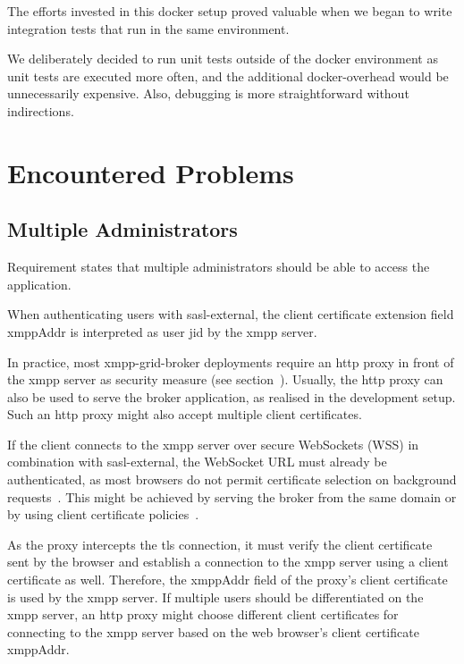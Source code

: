 The efforts invested in this docker setup proved valuable when we began to write integration tests that run in the same environment.

We deliberately decided to run unit tests outside of the docker environment as unit tests are executed more often, and the additional docker-overhead would be unnecessarily expensive.
Also, debugging is more straightforward without indirections.

\section{Encountered Problems}\label{encountered-problems}

\subsection{Multiple Administrators}\label{sec:limitations-of-requirement-multiple-administrators}

Requirement  states that multiple administrators should be able to access the application.

When authenticating users with \gls{sasl-external}, the client certificate extension field xmppAddr is interpreted as user \gls{jid} by the \gls{xmpp} server.

In practice, most \gls{xmpp-grid-broker} deployments require an \gls{http} proxy in front of the \gls{xmpp} server as security measure (see section~).
Usually, the \gls{http} proxy can also be used to serve the \gls{broker} application, as realised in the development setup.
Such an \gls{http} proxy might also accept multiple client certificates.

If the client connects to the \gls{xmpp} server over secure WebSockets (WSS) in combination with \gls{sasl-external}, the WebSocket URL must already be authenticated, as most browsers do not permit certificate selection on background requests~\cite{chromium-issue-background-certs}.
This might be achieved by serving the \gls{broker} from the same domain or by using client certificate policies~\cite{chrome-cert-policies}.

As the proxy intercepts the \gls{tls} connection, it must verify the client certificate sent by the browser and establish a connection to the \gls{xmpp} server using a client certificate as well.
Therefore, the xmppAddr field of the proxy's client certificate is used by the \gls{xmpp} server.
If multiple users should be differentiated on the \gls{xmpp} server, an \gls{http} proxy might choose different client certificates for connecting to the \gls{xmpp} server based on the web browser's client certificate xmppAddr.


